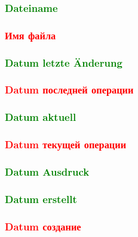 \documentclass[14pt,a4paper]{book}
\newcommand{\DE}[1]{\textcolor{green}{#1}}
\newcommand{\RU}[1]{\textcolor{red}{#1}}
\begin{document}
			\DE{\subsubsection{Dateiname}}
			\RU{\subsubsection{Имя файла}}
			\DE{\subsubsection{Datum letzte Änderung}}
			\RU{\subsubsection{Datum последней операции}}
			\DE{\subsubsection{Datum aktuell}}
			\RU{\subsubsection{Datum текущей операции}}
			\DE{\subsubsection{Datum Ausdruck}}
			\DE{\subsubsection{Datum erstellt}}
			\RU{\subsubsection{Datum создание}}
\end{document}
